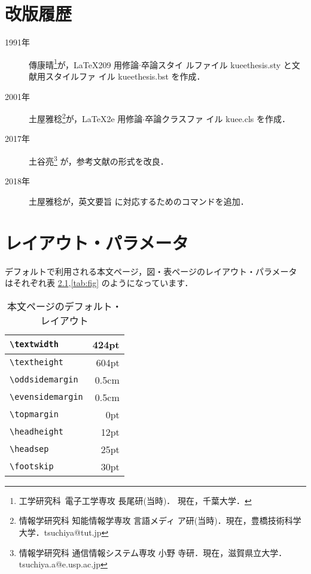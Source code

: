 \documentclass[
  sotsuron]{kuee}
\begin{document}



\appendix
\chapter{改版履歴}\label{chap:history}
\begin{description}
  \item[1991年] 傳康晴\footnote{工学研究科\ 電子工学専攻 長尾研(当時)．
          現在，千葉大学．}が，\LaTeX{}209 用修論$\cdot$卒論スタイ
        ルファイル kueethesis.sty と文献用スタイルファ
        イル kueethesis.bst を作成\cite{OldTebiki}．
  \item[2001年] 土屋雅稔\footnote{情報学研究科 知能情報学専攻 言語メディ
        ア研(当時)．現在，豊橋技術科学大学．tsuchiya@tut.jp}が，\LaTeX2e{} 用修論$\cdot$卒論クラスファ
        イル kuee.cls を作成\cite{Tebiki2004}．
        \setcounter{tsuaffil}{\value{footnote}}
  \item[2017年] 土谷亮\footnote{情報学研究科 通信情報システム専攻 小野
        寺研．現在，滋賀県立大学．tsuchiya.a@e.usp.ac.jp} が，参考文献の形式を改良．
  \item[2018年] 土屋雅稔\footnotemark[\value{tsuaffil}]{}が，英文要旨
        に対応するためのコマンドを追加．
\end{description}

\chapter{レイアウト・パラメータ}\label{chap:layout}

デフォルトで利用される本文ページ，図・表ページのレイアウト・パラメータ
はそれぞれ表 \ref{tab:text},\ref{tab:fig} のようになっています．

\begin{table}
  \caption{本文ページのデフォルト・レイアウト}\label{tab:text}
  \begin{center}
    \begin{tabular}{|l|r|}
      \hline
      \verb+\textwidth+ & 424pt \\ \hline
      \verb+\textheight+ & 604pt \\ \hline
      \verb+\oddsidemargin+ & 0.5cm \\ \hline
      \verb+\evensidemargin+ & 0.5cm \\ \hline
      \verb+\topmargin+ & 0pt   \\ \hline
      \verb+\headheight+ & 12pt  \\ \hline
      \verb+\headsep+ & 25pt  \\ \hline
      \verb+\footskip+ & 30pt  \\ \hline
    \end{tabular}
  \end{center}
\end{table}
\end{document}
